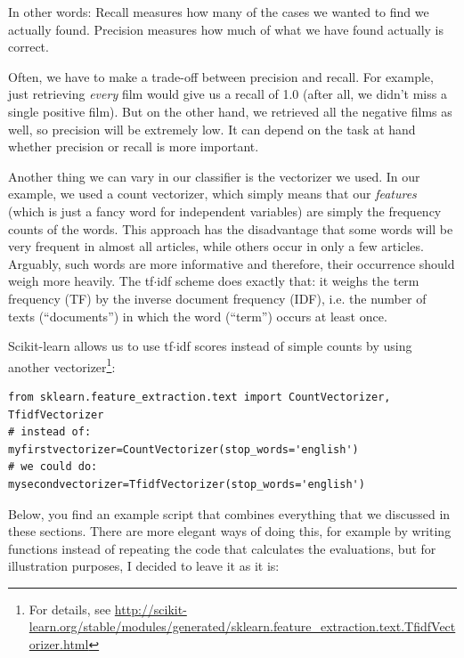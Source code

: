 \documentclass[a4paper,12pt]{book}
\begin{document}
In other words: Recall measures how many of the cases we wanted to find we actually found. Precision measures how much of what we have found actually is correct.

Often, we have to make a trade-off between precision and recall. For example, just retrieving \emph{every} film would give us a recall of 1.0 (after all, we didn't miss a single positive film). But on the other hand, we retrieved all the negative films as well, so precision will be extremely low. It can depend on the task at hand whether precision or recall is more important.

Another thing we can vary in our classifier is the vectorizer we used. In our example, we used a count vectorizer, which simply means that our \emph{features} (which is just a fancy word for independent variables) are simply the frequency counts of the words. This approach has the disadvantage that some words will be very frequent in almost all articles, while others occur in only a few articles. Arguably, such words are more informative and therefore, their occurrence should weigh more heavily. The tf$\cdot$idf scheme does exactly that: it weighs the term frequency (TF) by the inverse document frequency (IDF), i.e. the number of texts (``documents'') in which the word (``term'') occurs at least once.

Scikit-learn allows us to use tf$\cdot$idf scores instead of simple counts by using another vectorizer\footnote{For details, see \url{http://scikit-learn.org/stable/modules/generated/sklearn.feature_extraction.text.TfidfVectorizer.html}}:

\begin{lstlisting}
from sklearn.feature_extraction.text import CountVectorizer, TfidfVectorizer
# instead of:
myfirstvectorizer=CountVectorizer(stop_words='english')
# we could do:
mysecondvectorizer=TfidfVectorizer(stop_words='english')
\end{lstlisting}

Below, you find an example script that combines everything that we discussed in these sections. There are more elegant ways of doing this, for example by writing functions instead of repeating the code that calculates the evaluations, but for illustration purposes, I decided to leave it as it is:
\end{document}
